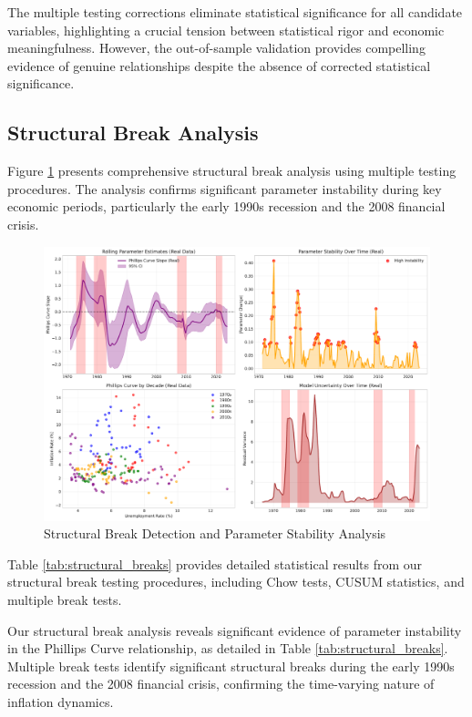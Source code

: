 \documentclass[12pt]{article}
\begin{document}
The multiple testing corrections eliminate statistical significance for all candidate variables, highlighting a crucial tension between statistical rigor and economic meaningfulness. However, the out-of-sample validation provides compelling evidence of genuine relationships despite the absence of corrected statistical significance.

\subsection{Structural Break Analysis}

Figure \ref{fig:structural_breaks} presents comprehensive structural break analysis using multiple testing procedures. The analysis confirms significant parameter instability during key economic periods, particularly the early 1990s recession and the 2008 financial crisis.

\begin{figure}[H]
\centering
\includegraphics[width=\textwidth]{figures/structural_breaks.pdf}
\caption{Structural Break Detection and Parameter Stability Analysis}
\label{fig:structural_breaks}
\end{figure}

Table \ref{tab:structural_breaks} provides detailed statistical results from our structural break testing procedures, including Chow tests, CUSUM statistics, and multiple break tests.


Our structural break analysis reveals significant evidence of parameter instability in the Phillips Curve relationship, as detailed in Table \ref{tab:structural_breaks}. Multiple break tests identify significant structural breaks during the early 1990s recession and the 2008 financial crisis, confirming the time-varying nature of inflation dynamics.
\end{document}
